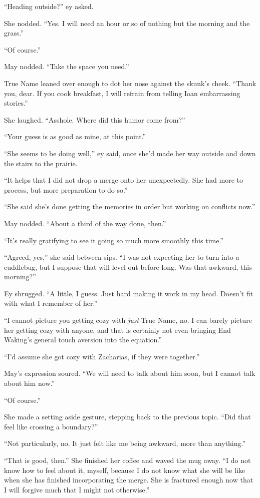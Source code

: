 ``Heading outside?'' ey asked.

She nodded. ``Yes. I will need an hour or so of nothing but the morning and the grass.''

``Of course.''

May nodded. ``Take the space you need.''

True Name leaned over enough to dot her nose against the skunk's cheek. ``Thank you, dear. If you cook breakfast, I will refrain from telling Ioan embarrassing stories.''

She laughed. ``Asshole. Where did this humor come from?''

``Your guess is as good as mine, at this point.''

``She seems to be doing well,'' ey said, once she'd made her way outside and down the stairs to the prairie.

``It helps that I did not drop a merge onto her unexpectedly. She had more to process, but more preparation to do so.''

``She said she's done getting the memories in order but working on conflicts now.''

May nodded. ``About a third of the way done, then.''

``It's really gratifying to see it going so much more smoothly this time.''

``Agreed, yes,'' she said between sips. ``I was not expecting her to turn into a cuddlebug, but I suppose that will level out before long. Was that awkward, this morning?''

Ey shrugged. ``A little, I guess. Just hard making it work in my head. Doesn't fit with what I remember of her.''

``I cannot picture you getting cozy with \emph{just} True Name, no. I can barely picture her getting cozy with anyone, and that is certainly not even bringing End Waking's general touch aversion into the equation.''

``I'd assume she got cozy with Zacharias, if they were together.''

May's expression soured. ``We will need to talk about him soon, but I cannot talk about him now.''

``Of course.''

She made a setting aside gesture, stepping back to the previous topic. ``Did that feel like crossing a boundary?''

``Not particularly, no. It just felt like me being awkward, more than anything.''

``That is good, then.'' She finished her coffee and waved the mug away. ``I do not know how to feel about it, myself, because I do not know what she will be like when she has finished incorporating the merge. She is fractured enough now that I will forgive much that I might not otherwise.''

